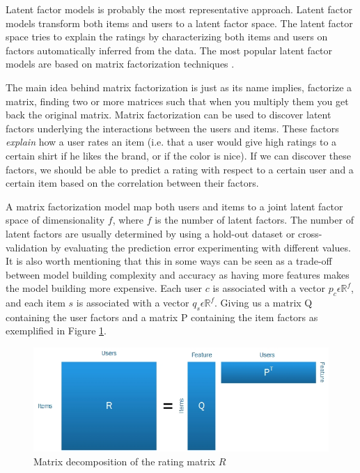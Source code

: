 Latent factor models is probably the most representative approach. Latent
factor models transform both items and users to a latent factor space. The
latent factor space tries to explain the ratings by characterizing both items
and users on factors automatically inferred from the data. The most popular
latent factor models are based on matrix factorization techniques
\cite{Koren2009}.

The main idea behind matrix factorization is just as its name implies,
factorize a matrix, finding two or more matrices such that when you multiply
them you get back the original matrix. Matrix factorization can be used to
discover latent factors underlying the interactions between the users and
items. These factors \emph{explain} how a user rates an item (i.e. that a user
would give high ratings to a certain shirt if he likes the brand, or if the
color is nice). If we can discover these factors, we should be able to predict
a rating with respect to a certain user and a certain item based on the
correlation between their factors.

A matrix factorization model map both users and items to a joint latent factor
space of dimensionality $f$, where $f$ is the number of latent factors. The
number of latent factors are usually determined by using a hold-out dataset or
cross-validation by evaluating the prediction error experimenting with
different values. It is also worth mentioning that this in some ways can be
seen as a trade-off between model building complexity and accuracy as having
more features makes the model building more expensive. Each user $c$ is
associated with a vector $p_{c} \epsilon \mathbb{R}^{f}$, and each item $s$ is
associated with a vector $q_{s} \epsilon \mathbb{R}^{f}$. Giving us a matrix Q
containing the user factors and a matrix P containing the item factors as
exemplified in Figure \ref{figure:matrixdecomp}.

\begin{figure}[H]
    \includegraphics[width=5in]{image/matrixdecomp.jpg}
    \centering
    \caption[Matrix decomposition of the rating matrix $R$]{Matrix decomposition of the rating matrix $R$}
    \label{figure:matrixdecomp}
\end{figure}

